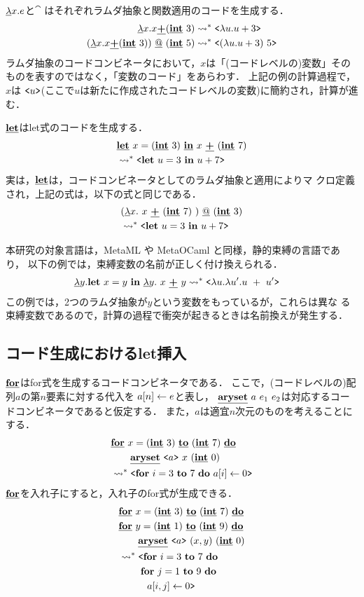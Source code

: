 $\cfun{x}{e}$と$\cat$ はそれぞれラムダ抽象と関数適用のコードを生成する．
\begin{align*}
  \cfun{x}{x \cPlus (\cint~3)}   & \too \code{\fun{u}{u+3}} \\
  (\cfun{x}{x \cPlus (\cint~3)}) \cat (\cint~5) & \too
                                                  \code{(\fun{u}{u+3})~5}
\end{align*}
ラムダ抽象のコードコンビネータにおいて，$x$は「(コードレベルの)変数」その
ものを表すのではなく，「変数のコード」をあらわす．
上記の例の計算過程で，$x$は
$\code{u}$(ここで$u$は新たに作成されたコードレベルの変数)に簡約され，計算が進む．

$\cLet$はlet式のコードを生成する．
\begin{align*}
  & \clet{x}{(\cint~3)}{x~ \cPlus~ (\cint~7)} \\
  & \too \code{\Let~ u = 3~ \In~ u + 7}
\end{align*}
実は，$\cLet$は，コードコンビネータとしてのラムダ抽象と適用によりマ
クロ定義され，上記の式は，以下の式と同じである．
\begin{align*}
  & (\cfun{x}{~x~ \cPlus~ (\cint~7)~}) \cat (\cint~3)  \\
  & \too \code{\Let~ u = 3~ \In~ u + 7}
\end{align*}

本研究の対象言語は，MetaML や MetaOCaml と同様，静的束縛の言語であり，
以下の例では，束縛変数の名前が正しく付け換えられる．
\begin{align*}
  \cfun{y}{\Let~ x = y~ \In~ \cfun{y}{~x~ \cPlus~ y}{}}{}
  & \too \code{\fun{u}{\fun{u'}{u~ +~ u'}}}
\end{align*}
この例では，2つのラムダ抽象が$y$という変数をもっているが，これらは異な
る束縛変数であるので，計算の過程で衝突が起きるときは名前換えが発生する．

\subsection{コード生成におけるlet挿入}

$\cFor$はfor式を生成するコードコンビネータである．
ここで，(コードレベルの)配列$a$の第$n$要素に対する代入を
$\aryset{a}{n}{e}$と表し，
$\caryset{a}{e_1}{e_2}$は対応するコードコンビネータであると仮定する．
また，$a$は適宜$n$次元のものを考えることにする．
\begin{align*}
  & \cforin{x=(\cint~3)}{(\cint~7)} \\
  & \qquad \caryset{\code{a}}{x}{(\cint~0)} \\
  & \too \code{\forin{i=3}{7}~\aryset{a}{i}{0}}
\end{align*}
$\cFor$を入れ子にすると，入れ子のfor式が生成できる．
\begin{align*}
  & \cforin{x=(\cint~3)}{(\cint~7)} \\
  & \cforin{y=(\cint~1)}{(\cint~9)} \\
  & \qquad \caryset{\code{a}}{(x,y)}{(\cint~0)} \\
  & \too \codebegin \forin{i=3}{7} \\
  & \phantom{\too \codebegin} \forin{j=1}{9} \\
  & \phantom{\too \codebegin} ~~\aryset{a}{i,j}{0} \codeend
\end{align*}

